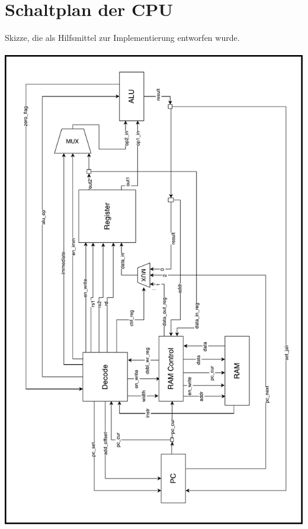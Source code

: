 
\chapter{Schaltplan der CPU} %

\label{schaltplan} %
Skizze, die als Hilfsmittel zur Implementierung entworfen wurde.\\
\\
\includegraphics[height=0.8\textheight]{Figures/schaltplan.pdf}

